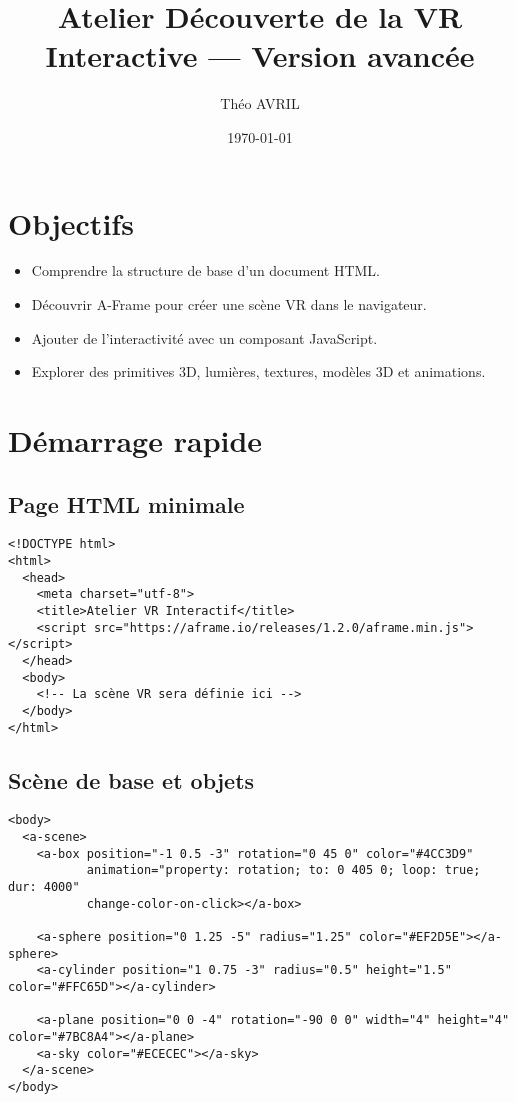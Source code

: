 \documentclass[12pt]{article}
\title{Atelier Découverte de la VR Interactive — Version avancée}
\author{Théo AVRIL}
\date{\today}
\begin{document}
\maketitle

\section{Objectifs}
\begin{itemize}
    \item Comprendre la structure de base d'un document HTML.
    \item Découvrir A-Frame pour créer une scène VR dans le navigateur.
    \item Ajouter de l'interactivité avec un composant JavaScript.
    \item Explorer des primitives 3D, lumières, textures, modèles 3D et animations.
\end{itemize}

\section{Démarrage rapide}
\subsection{Page HTML minimale}
\begin{verbatim}
<!DOCTYPE html>
<html>
  <head>
    <meta charset="utf-8">
    <title>Atelier VR Interactif</title>
    <script src="https://aframe.io/releases/1.2.0/aframe.min.js"></script>
  </head>
  <body>
    <!-- La scène VR sera définie ici -->
  </body>
</html>
\end{verbatim}

\subsection{Scène de base et objets}
\begin{verbatim}
<body>
  <a-scene>
    <a-box position="-1 0.5 -3" rotation="0 45 0" color="#4CC3D9"
           animation="property: rotation; to: 0 405 0; loop: true; dur: 4000"
           change-color-on-click></a-box>

    <a-sphere position="0 1.25 -5" radius="1.25" color="#EF2D5E"></a-sphere>
    <a-cylinder position="1 0.75 -3" radius="0.5" height="1.5" color="#FFC65D"></a-cylinder>

    <a-plane position="0 0 -4" rotation="-90 0 0" width="4" height="4" color="#7BC8A4"></a-plane>
    <a-sky color="#ECECEC"></a-sky>
  </a-scene>
</body>
\end{verbatim}
\end{document}
